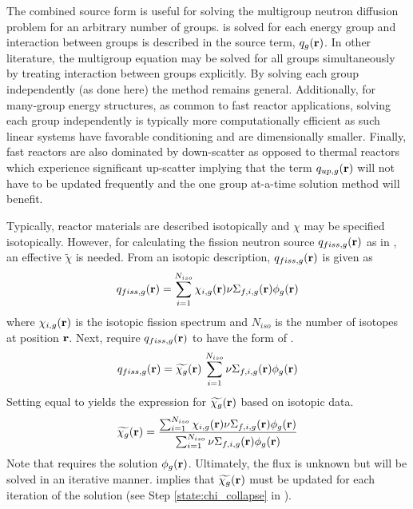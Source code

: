   The combined source form is useful for solving the multigroup neutron
  diffusion problem for an arbitrary number of groups.
   is solved for each energy group and interaction
  between groups is described in the source term, $q_g(\mathbf{r})$. In other
  literature, the multigroup equation may be solved for all groups
  simultaneously by treating interaction between groups explicitly. By solving
  each group independently (as done here) the method remains general.
  Additionally, for many-group energy structures, as common to fast reactor
  applications, solving each group independently is typically more
  computationally efficient as such linear systems have favorable conditioning
  and are dimensionally smaller. Finally, fast reactors are also dominated by
  down-scatter as opposed to thermal reactors which experience significant
  up-scatter implying that the term $q_{up,g}(\mathbf{r})$ will not have to be updated
  frequently and the one group at-a-time solution method will benefit.

  Typically, reactor materials are described isotopically and $\chi$ may be
  specified isotopically. However, for calculating the fission neutron source
  $q_{fiss,g}(\mathbf{r})$ as in , an effective $\widetilde{\chi}$ is 
  needed. From an isotopic description, $q_{fiss,g}(\mathbf{r})$ is given as
  \begin{equation}
    \label{eq:isotopic_chi}
    q_{fiss,g}(\mathbf{r}) = \sum_{i=1}^{N_{iso}} \chi_{i,g}(\mathbf{r})
      \nu \Sigma_{f,i,g}(\mathbf{r}) \phi_g(\mathbf{r})
  \end{equation}
  where $\chi_{i,g}(\mathbf{r})$ is the isotopic fission spectrum and $N_{iso}$ is the 
  number of isotopes at position $\mathbf{r}$. Next, require $q_{fiss,g}(\mathbf{r})$ to have 
  the form of .
  \begin{equation}
    \label{eq:element_chi}
    q_{fiss,g}(\mathbf{r}) = \widetilde{\chi_g}(\mathbf{r}) \, 
      \sum_{i=1}^{N_{iso}} \nu \Sigma_{f,i,g}(\mathbf{r}) \phi_g(\mathbf{r})
  \end{equation}
  Setting  equal to  yields the
  expression for $\widetilde{\chi_g}(\mathbf{r})$ based on isotopic data.
  \begin{equation}
    \label{eq:chi_collapse}
    \widetilde{\chi_g}(\mathbf{r}) = \frac{\sum_{i=1}^{N_{iso}} \chi_{i,g}(\mathbf{r})
      \nu \Sigma_{f,i,g}(\mathbf{r}) \phi_g(\mathbf{r})}
      {\sum_{i=1}^{N_{iso}} \nu \Sigma_{f,i,g}(\mathbf{r}) \phi_g(\mathbf{r})}
  \end{equation}
  Note that  requires the solution $\phi_g(\mathbf{r})$.
  Ultimately, the flux is unknown but will be solved in an iterative manner.
   implies that $\widetilde{\chi_g}(\mathbf{r})$ must be updated
  for each iteration of the solution (see Step \ref{state:chi_collapse} in
  ).
  
